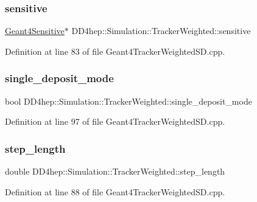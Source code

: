 \subsubsection{\texorpdfstring{sensitive}{sensitive}}
{\footnotesize\ttfamily \hyperlink{class_d_d4hep_1_1_simulation_1_1_geant4_sensitive}{Geant4\+Sensitive}$\ast$ D\+D4hep\+::\+Simulation\+::\+Tracker\+Weighted\+::sensitive}



Definition at line 83 of file Geant4\+Tracker\+Weighted\+S\+D.\+cpp.

\hypertarget{struct_d_d4hep_1_1_simulation_1_1_tracker_weighted_aca48801717dfd735529eb3fda99e999a}{}\label{struct_d_d4hep_1_1_simulation_1_1_tracker_weighted_aca48801717dfd735529eb3fda99e999a} 
\subsubsection{\texorpdfstring{single\+\_\+deposit\+\_\+mode}{single\_deposit\_mode}}
{\footnotesize\ttfamily bool D\+D4hep\+::\+Simulation\+::\+Tracker\+Weighted\+::single\+\_\+deposit\+\_\+mode}



Definition at line 97 of file Geant4\+Tracker\+Weighted\+S\+D.\+cpp.

\hypertarget{struct_d_d4hep_1_1_simulation_1_1_tracker_weighted_a82fd5f47ec95d179a132145c54a78873}{}\label{struct_d_d4hep_1_1_simulation_1_1_tracker_weighted_a82fd5f47ec95d179a132145c54a78873} 
\subsubsection{\texorpdfstring{step\+\_\+length}{step\_length}}
{\footnotesize\ttfamily double D\+D4hep\+::\+Simulation\+::\+Tracker\+Weighted\+::step\+\_\+length}



Definition at line 88 of file Geant4\+Tracker\+Weighted\+S\+D.\+cpp.


